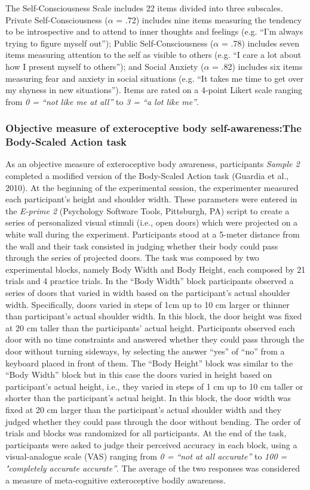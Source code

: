 \documentclass[man]{apa7}
\begin{document}
The Self-Consciousness Scale \parencite{scheier1985self} includes 22 items divided into three subscales. Private Self-Consciousness ($\alpha$ = .72) includes nine items measuring the tendency to be introspective and to attend to inner thoughts and feelings (e.g. “I’m always trying to figure myself out”); Public Self-Consciousness ($\alpha$ = .78) includes seven items measuring attention to the self as visible to others (e.g. “I care a lot about how I present myself to others”); and Social Anxiety ($\alpha$ = .82) includes six items measuring fear and anxiety in social situations (e.g. “It takes me time to get over my shyness in new situations”). Items are rated on a 4-point Likert scale ranging from \emph{0 = “not like me at all”} to \emph{3 = “a lot like me”}.  
\subsubsection{Objective measure of exteroceptive body self-awareness:The Body-Scaled Action task} 
As an objective measure of exteroceptive body awareness, participants \emph{Sample 2} completed a modified version of the Body-Scaled Action task (Guardia et al., 2010). At the beginning of the experimental session, the experimenter measured each participant’s height and shoulder width. These parameters were entered in the \emph{E-prime 2} (Psychology Software Tools, Pittsburgh, PA) script to create a series of personalized visual stimuli (i.e., open doors) which were projected on a white wall during the experiment. Participants stood at a 5-meter distance from the wall and their task consisted in judging whether their body could pass through the series of projected doors. The task was composed by two experimental blocks, namely Body Width and Body Height, each composed by 21 trials and 4 practice trials. In the “Body Width” block participants observed a series of doors that varied in width based on the participant’s actual shoulder width. Specifically, doors varied in steps of 1cm up to 10 cm larger or thinner than participant’s actual shoulder width. In this block, the door height was fixed at 20 cm taller than the participants’ actual height. Participants observed each door with no time constraints and answered whether they could pass through the door without turning sideways, by selecting the answer “yes” of “no” from a keyboard placed in front of them. The “Body Height” block was similar to the “Body Width” block but in this case the doors varied in height based on participant’s actual height, i.e., they varied in steps of 1 cm up to 10 cm taller or shorter than the participant’s actual height. In this block, the door width was fixed at 20 cm larger than the participant’s actual shoulder width and they judged whether they could pass through the door without bending. The order of trials and blocks was randomized for all participants. At the end of the task, participants were asked to judge their perceived accuracy in each block, using a visual-analogue scale (VAS) ranging from \emph{0 = “not at all accurate”} to \emph{100 = "completely accurate accurate”}. The average of the two responses was considered a measure of meta-cognitive exteroceptive bodily awareness. 
\end{document}
